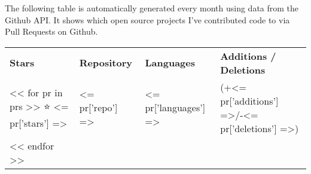 \documentclass[../cv.tex]{subfiles}
\begin{document}
The following table is automatically generated every month using data from the Github API.
It shows which open source projects I've contributed code to via Pull Requests on Github.
 

\begin{tabular}{llll}
\textbf{Stars} & \textbf{Repository} & \textbf{Languages} & \textbf{Additions / Deletions} \\
<< for pr in prs >>
⭐ <= pr['stars'] => & <= pr['repo'] => & <= pr['languages'] => & (+<= pr['additions'] =>/-<= pr['deletions'] =>)\\
<< endfor >>
\end{tabular}
\end{document}

